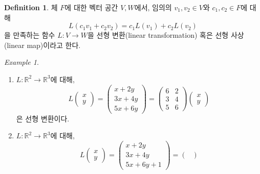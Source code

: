 \documentclass[unfonts,oneside,a4paper]{oblivoir}
\theoremstyle{definition}
\newtheorem{definition}{Definition}
\theoremstyle{theorem}
\theoremstyle{remark}
\theoremstyle{remark}
\theoremstyle{remark}
\newtheorem*{example}{Example}
\theoremstyle{remark}
\renewcommand{\vec}[1]{\bm{\mathit{#1}}}
\begin{document}
\begin{definition}
    체 $F$에 대한 벡터 공간 $V, W$에서, 임의의 $\vec v_1, \vec v_2 \in V$와 $c_1, c_2 \in F$에 대해
    \begin{equation*}
        L(c_1 \vec v_1 + c_2 \vec v_2) = c_1 L(\vec v_1) + c_2 L(\vec v_2)
    \end{equation*}
    을 만족하는 함수 $L: V \rightarrow W$을 선형 변환(linear transformation) 혹은 선형 사상(linear map)이라고 한다.
\end{definition}

\begin{example}
    \leavevmode
    \begin{enumerate}
        \item $L: \mathbb R^2 \rightarrow \mathbb R^3$에 대해,
            \begin{equation*}
                L \begin{pmatrix}
                    x \\ y
                    \end{pmatrix} = \begin{pmatrix}
                    x + 2y \\ 3x + 4y \\ 5x + 6y
                    \end{pmatrix} = \begin{pmatrix}
                    6 & 2 \\ 3 & 4 \\ 5 & 6
                    \end{pmatrix} \begin{pmatrix}
                    x \\ y
                \end{pmatrix}
            \end{equation*}
            은 선형 변환이다.
        \item $L: \mathbb R^2 \rightarrow \mathbb R^3$에 대해,
            \begin{equation*}
                L \begin{pmatrix}
                    x \\ y
                    \end{pmatrix} = \begin{pmatrix}
                    x + 2y \\ 3x + 4y \\ 5x + 6y + 1
                    \end{pmatrix} = \begin{pmatrix}

\end{pmatrix}
\end{equation*}
\end{enumerate}
\end{example}
\end{document}

